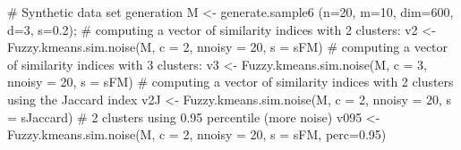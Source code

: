 \documentclass{article}
\begin{document}
\begin{Examples}
\begin{ExampleCode}
# Synthetic data set generation
M <- generate.sample6 (n=20, m=10, dim=600, d=3, s=0.2);
# computing a vector of similarity indices with 2 clusters:
v2 <- Fuzzy.kmeans.sim.noise(M, c = 2, nnoisy = 20,  s = sFM)
# computing a vector of similarity indices with 3 clusters:
v3 <- Fuzzy.kmeans.sim.noise(M, c = 3, nnoisy = 20,  s = sFM)
# computing a vector of similarity indices with 2 clusters using the Jaccard index
v2J <- Fuzzy.kmeans.sim.noise(M, c = 2, nnoisy = 20,  s = sJaccard)
# 2 clusters using 0.95 percentile (more noise)
v095 <- Fuzzy.kmeans.sim.noise(M, c = 2, nnoisy = 20,  s = sFM, perc=0.95)
\end{ExampleCode}
\end{Examples}
\end{document}
